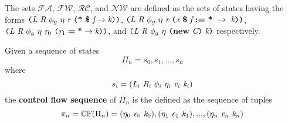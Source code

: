 \begin{definition}
The sets $\mathcal{FA}$, $\mathcal{FW}$, $\mathcal{RC}$, and  $\mathcal{NW}$ are defined as the sets of states having the forms $ \lp \cfgnt{L}\ \cfgnt{R}\ \phi_g\ \eta\ \cfgnt{r}\ \lp \cfgt{*}\ \cfgt{\$}\ \cfgnt{f} \rightarrow \cfgnt{k}\rp \rp$,  $\lp \cfgnt{L}\ \cfgnt{R}\ \phi_g\ \eta\ \cfgnt{r}\ \lp \cfgnt{x}\ \cfgt{\$}\ \cfgnt{f}\ \cfgt{:=}\ \cfgt{*}\ \rightarrow\ \cfgnt{k}\rp \rp$, $\texttt{(} \emph{L}\ \emph{R}\ \phi_g\ \eta\ \emph{r}_0\ \texttt{(} \emph{r}_1\; \textbf{=}\; \textbf{*} \rightarrow \emph{k}\texttt{)} \texttt{)}$, and $\texttt{(} \emph{L}\ \emph{R}\ \phi_g\ \eta\ \texttt{(} \textbf{new}\ \emph{C}\texttt{)} \ \emph{k}\texttt{)}$ respectively.
\end{definition}


\begin{definition}
Given a sequence of states $$\Pi_n = s_0,s_1,...,s_n$$ where $$s_i = (\cfgnt{L}_i\ \cfgnt{R}_i\ \phi_i\ \eta_i\ \cfgnt{e}_i\ \cfgnt{k}_i )$$ the \textbf{control flow sequence} of $\Pi_n$ is the defined as the sequence of tuples $$ \pi_n = \mathbb{CF}(\Pi_n) = (\eta_0\ \cfgnt{e}_0\ \cfgnt{k}_0),(\eta_1\ \cfgnt{e}_1\ \cfgnt{k}_1),...,(\eta_n\ \cfgnt{e}_n\ \cfgnt{k}_n)$$
\end{definition}

